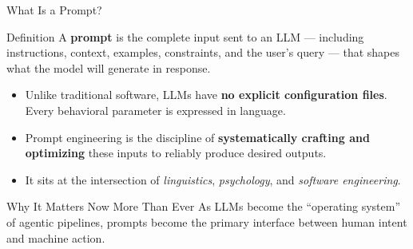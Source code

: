 \documentclass{beamer}
\begin{document}
\begin{frame}{What Is a Prompt?}
    \begin{block}{Definition}
        A \textbf{prompt} is the complete input sent to an LLM --- including instructions,
        context, examples, constraints, and the user's query --- that shapes what the model
        will generate in response.
    \end{block}

    \vspace{0.2cm}
    \begin{itemize}
        \item Unlike traditional software, LLMs have \textbf{no explicit configuration files}.
              Every behavioral parameter is expressed in language.
        \item Prompt engineering is the discipline of \textbf{systematically crafting and optimizing}
              these inputs to reliably produce desired outputs.
        \item It sits at the intersection of \emph{linguistics}, \emph{psychology}, and
              \emph{software engineering}.
    \end{itemize}

    \vspace{0.2cm}
    \begin{alertblock}{Why It Matters Now More Than Ever}
        As LLMs become the ``operating system'' of agentic pipelines,
        prompts become the primary interface between human intent and machine action.
    \end{alertblock}
\end{frame}
\end{document}
